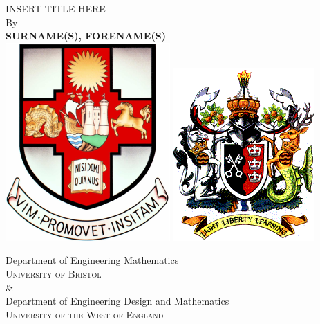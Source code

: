 \begin{titlepage}
    \begin{center}
        \vspace*{1cm}
        {\huge
        INSERT TITLE HERE }
        \vspace{0.5cm}
        \\
        {\large By}
        \\
        \vspace{0.5cm}
        \textbf{SURNAME(S), FORENAME(S)}
   		\vspace{1.5cm}
        \\
        \vspace{0.25cm}
       \includegraphics[scale=0.6]{logos/bristolcrest_colour.pdf}
        \hspace{5mm}
        \includegraphics[scale=0.35]{logos/UWE_insignia.png}

        \vspace{10mm}
        {\large Department of Engineering Mathematics\\
        \textsc{University of Bristol}}
        \\
        \&
        \\
        {\large Department of Engineering Design and Mathematics\\
        \textsc{University of the West of England}}\\


\end{center}
\end{titlepage}
